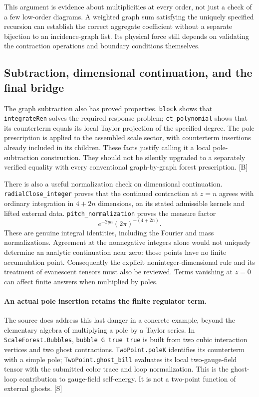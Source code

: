 \documentclass[11pt]{article}
\newcommand{\code}[1]{{\small\nolinkurl{#1}}}
\newcommand{\src}[1]{\textsf{[#1]}}
\begin{document}
This argument is evidence about multiplicities at every order, not just
a check of a few low-order diagrams. A weighted graph sum satisfying
the uniquely specified recursion can establish the correct aggregate
coefficient without a separate bijection to an incidence-graph list.
Its physical force still depends on validating the contraction
operations and boundary conditions themselves.

\subsection{Subtraction, dimensional continuation, and the final bridge}

The graph subtraction also has proved properties. \code{block}
shows that \code{integrateRen} solves the required response problem;
\code{ct_polynomial} shows that its counterterm equals its local Taylor
projection of the specified degree. The pole prescription is applied
to the assembled scale sector, with counterterm insertions already
included in its children. These facts justify calling it a local
pole-subtraction construction. They should not be silently upgraded
to a separately verified equality with every conventional
graph-by-graph forest prescription. \src{B}

There is also a useful normalization check on dimensional continuation.
\code{radialClose_integer} proves that the continued contraction at
$z=n$ agrees with ordinary integration in $4+2n$ dimensions, on its
stated admissible kernels and lifted external data.
\code{pitch_normalization} proves the measure factor
\[
 e^{-2yn}(2\pi)^{-(4+2n)}.
\]
These are genuine integral identities, including the Fourier and mass
normalizations. Agreement at the nonnegative integers alone would not
uniquely determine an analytic continuation near zero: those points
have no finite accumulation point. Consequently the explicit
noninteger-dimensional rule and its treatment of evanescent tensors
must also be reviewed. Terms vanishing at $z=0$ can affect finite
answers when multiplied by poles.

\paragraph{An actual pole insertion retains the finite regulator term.}
The source does address this last danger in a concrete example, beyond
the elementary algebra of multiplying a pole by a Taylor series.
In \code{ScaleForest.Bubbles}, \code{bubble G true true} is built from
two cubic interaction vertices and two ghost contractions.
\code{TwoPoint.poleK} identifies its counterterm with a simple pole;
\code{TwoPoint.ghost_bill} evaluates its local two-gauge-field tensor
with the submitted color trace and loop normalization. This is the
ghost-loop contribution to gauge-field self-energy. It is not a
two-point function of external ghosts. \src{S}
\end{document}
